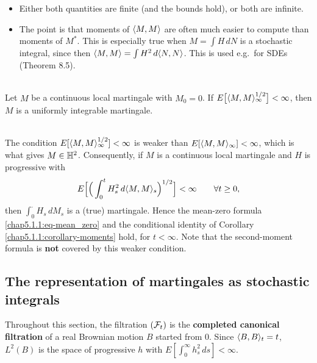 \begin{remark}
\begin{itemize}
    \item Either both quantities are finite (and the bounds hold), or both are infinite.
    \item The point is that moments of $\langle M,M\rangle$ are often much easier to compute than moments of $M^*$. This is especially true when $M=\int H\,dN$ is a stochastic integral, since then $\langle M,M\rangle=\int H^2\,d\langle N,N\rangle$. This is used e.g.\ for SDEs (Theorem 8.5).
\end{itemize}
\end{remark}

\begin{corollary}\label{chap5.3.3:corollary-UI_criterion}
\\
Let $M$ be a continuous local martingale with $M_0=0$. If $E\big[\langle M,M\rangle_\infty^{1/2}\big]<\infty$, then $M$ is a uniformly integrable martingale.
\end{corollary}

\begin{remark}\label{chap5.3.3:remark-martingale_criterion_integrals}
\\
The condition $E[\langle M,M\rangle_\infty^{1/2}]<\infty$ is weaker than $E[\langle M,M\rangle_\infty]<\infty$, which is what gives $M\in\mathbb{H}^2$. Consequently, if $M$ is a continuous local martingale and $H$ is progressive with
$$E\Big[\Big(\int_0^tH_s^2\,d\langle M,M\rangle_s\Big)^{1/2}\Big]<\infty\qquad\forall t\geq0,$$
then $\int_0^\cdot H_s\,dM_s$ is a (true) martingale. Hence the mean-zero formula \eqref{chap5.1.1:eq-mean_zero} and the conditional identity of Corollary \ref{chap5.1.1:corollary-moments} hold, for $t<\infty$. Note that the second-moment formula is \textbf{not} covered by this weaker condition.
\end{remark}

\subsection{The representation of martingales as stochastic integrals}
Throughout this section, the filtration $(\mathcal{F}_t)$ is the \textbf{completed canonical filtration} of a real Brownian motion $B$ started from $0$. Since $\langle B,B\rangle_t=t$, $L^2(B)$ is the space of progressive $h$ with $E[\int_0^\infty h_s^2\,ds]<\infty$.

